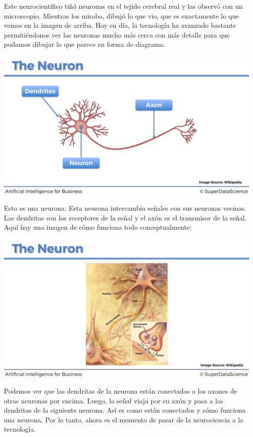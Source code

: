\documentclass[
]{book}
\begin{document}
Este neurocientífico tiñó neuronas en el tejido cerebral real y las observó con un microscopio. Mientras los miraba, dibujó lo que vio, que es exactamente lo que vemos en la imagen de arriba. Hoy en día, la tecnología ha avanzado bastante permitiéndonos ver las neuronas mucho más cerca con más detalle para que podamos dibujar lo que parece en forma de diagrama.

\includegraphics{Images/ANN_3.png}

Esto es una neurona. Esta neurona intercambia señales con sus neuronas vecinas. Las dendritas son los receptores de la señal y el axón es el transmisor de la señal. Aquí hay una imagen de cómo funciona todo conceptualmente:

\includegraphics{Images/ANN_4.png}

Podemos ver que las dendritas de la neurona están conectadas a los axones de otras neuronas por encima. Luego, la señal viaja por su axón y pasa a las dendritas de la siguiente neurona. Así es como están conectados y cómo funciona una neurona. Por lo tanto, ahora es el momento de pasar de la neurociencia a la tecnología.
\end{document}
